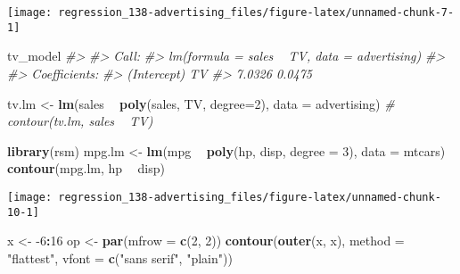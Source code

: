 \documentclass[]{book}
\newenvironment{Shaded}{\begin{snugshade}}{\end{snugshade}}
\newcommand{\CommentTok}[1]{\textcolor[rgb]{0.56,0.35,0.01}{\textit{#1}}}
\newcommand{\DataTypeTok}[1]{\textcolor[rgb]{0.13,0.29,0.53}{#1}}
\newcommand{\DecValTok}[1]{\textcolor[rgb]{0.00,0.00,0.81}{#1}}
\newcommand{\KeywordTok}[1]{\textcolor[rgb]{0.13,0.29,0.53}{\textbf{#1}}}
\newcommand{\NormalTok}[1]{#1}
\newcommand{\OperatorTok}[1]{\textcolor[rgb]{0.81,0.36,0.00}{\textbf{#1}}}
\newcommand{\StringTok}[1]{\textcolor[rgb]{0.31,0.60,0.02}{#1}}
\begin{document}
\begin{center}\texttt{[image: regression\_138-advertising\_files/figure-latex/unnamed-chunk-7-1]} \end{center}

\begin{Shaded}
\begin{Highlighting}[]
\NormalTok{tv_model}
\CommentTok{#> }
\CommentTok{#> Call:}
\CommentTok{#> lm(formula = sales ~ TV, data = advertising)}
\CommentTok{#> }
\CommentTok{#> Coefficients:}
\CommentTok{#> (Intercept)           TV  }
\CommentTok{#>      7.0326       0.0475}
\end{Highlighting}
\end{Shaded}

\begin{Shaded}
\begin{Highlighting}[]
\NormalTok{tv.lm <-}\StringTok{ }\KeywordTok{lm}\NormalTok{(sales }\OperatorTok{~}\StringTok{ }\KeywordTok{poly}\NormalTok{(sales, TV, }\DataTypeTok{degree=}\DecValTok{2}\NormalTok{), }\DataTypeTok{data =}\NormalTok{ advertising)}
\CommentTok{# contour(tv.lm, sales ~ TV)}
\end{Highlighting}
\end{Shaded}

\begin{Shaded}
\begin{Highlighting}[]
\KeywordTok{library}\NormalTok{(rsm)}
\NormalTok{mpg.lm <-}\StringTok{ }\KeywordTok{lm}\NormalTok{(mpg }\OperatorTok{~}\StringTok{ }\KeywordTok{poly}\NormalTok{(hp, disp, }\DataTypeTok{degree =} \DecValTok{3}\NormalTok{), }\DataTypeTok{data =}\NormalTok{ mtcars)}
\KeywordTok{contour}\NormalTok{(mpg.lm, hp }\OperatorTok{~}\StringTok{ }\NormalTok{disp)}
\end{Highlighting}
\end{Shaded}

\begin{center}\texttt{[image: regression\_138-advertising\_files/figure-latex/unnamed-chunk-10-1]} \end{center}

\begin{Shaded}
\begin{Highlighting}[]
\NormalTok{x <-}\StringTok{ }\DecValTok{-6}\OperatorTok{:}\DecValTok{16}
\NormalTok{op <-}\StringTok{ }\KeywordTok{par}\NormalTok{(}\DataTypeTok{mfrow =} \KeywordTok{c}\NormalTok{(}\DecValTok{2}\NormalTok{, }\DecValTok{2}\NormalTok{))}
\KeywordTok{contour}\NormalTok{(}\KeywordTok{outer}\NormalTok{(x, x), }\DataTypeTok{method =} \StringTok{"flattest"}\NormalTok{, }\DataTypeTok{vfont =} \KeywordTok{c}\NormalTok{(}\StringTok{"sans serif"}\NormalTok{, }\StringTok{"plain"}\NormalTok{))}
\end{Highlighting}
\end{Shaded}
\end{document}
